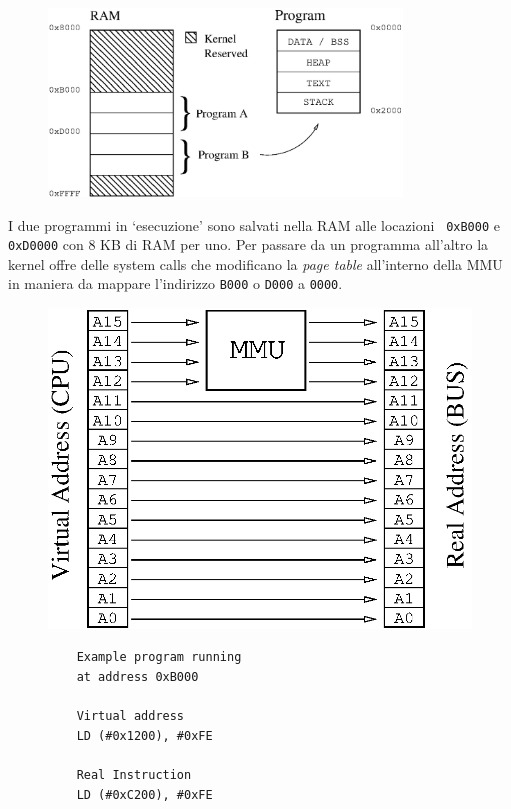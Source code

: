 \documentclass[a4paper, 11pt]{article}
\begin{document}
\begin{figure}[h!]
    \centering
    \includegraphics[height=5cm]{res/mmu_ram_map}
\end{figure}

I due programmi in `esecuzione' sono salvati nella RAM alle locazioni {\tt
0xB000} e {\tt 0xD0000} con 8 KB di RAM per uno. Per passare da un programma
all'altro la kernel offre delle system calls che modificano la \emph{page
table} all'interno della MMU in maniera da mappare l'indirizzo {\tt B000} o
{\tt D000} a {\tt 0000}.

\begin{figure}[h!]
\centering
\begin{minipage}[c]{.45\textwidth} \centering
    \includegraphics[width=\linewidth]{res/mmu_addr}
\end{minipage}%
\begin{minipage}[c]{.45\textwidth} \centering
\begin{verbatim}
    Example program running 
    at address 0xB000

    Virtual address
    LD (#0x1200), #0xFE

    Real Instruction
    LD (#0xC200), #0xFE
\end{verbatim}
\end{minipage}
\end{figure}
\end{document}
